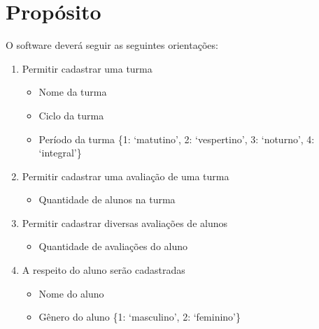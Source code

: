     \section{Propósito}
    O software deverá seguir as seguintes orientações:

    \begin{enumerate}

        \item Permitir cadastrar uma turma

            \begin{itemize}

                \item Nome da turma

                \item Ciclo da turma

                \item Período da turma \{1: `matutino', 2: `vespertino',
                    3: `noturno', 4: `integral'\}

            \end{itemize}

        \item Permitir cadastrar uma avaliação de uma turma

            \begin{itemize}

                \item Quantidade de alunos na turma

            \end{itemize}

        \item Permitir cadastrar diversas avaliações de alunos

            \begin{itemize}

                \item Quantidade de avaliações do aluno

            \end{itemize}

        \item A respeito do aluno serão cadastradas

            \begin{itemize}

                \item Nome do aluno

                \item Gênero do aluno \{1: `masculino', 2: `feminino'\}


\end{itemize}
\end{enumerate}
